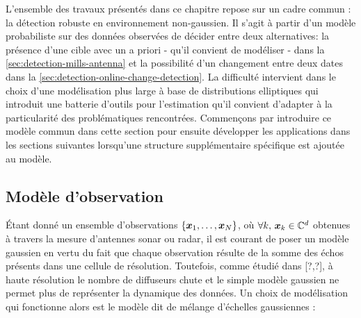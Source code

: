 L'ensemble des travaux présentés dans ce chapitre repose sur un cadre commun : la détection robuste en environnement non-gaussien. Il s'agit à partir d'un modèle probabiliste sur des données observées de décider entre deux alternatives: la présence d'une cible avec un a priori - qu'il convient de modéliser - dans la \cref{sec:detection-mills-antenna} et la possibilité d'un changement entre deux dates dans la \cref{sec:detection-online-change-detection}. La difficulté intervient dans le choix d'une modélisation plus large à base de distributions elliptiques qui introduit une batterie d'outils pour l'estimation qu'il convient d'adapter à la particularité des problématiques rencontrées. Commençons par introduire ce modèle commun dans cette section pour ensuite développer les applications dans les sections suivantes lorsqu'une structure supplémentaire spécifique est ajoutée au modèle.


\subsection{Modèle d'observation}
\label{subsec:detection-modele}


\'Etant donné un ensemble d'observations $\{\boldsymbol{x}_1,\dots,\boldsymbol{x}_N\}$, où $\forall k,\, \boldsymbol{x}_k\in\mathbb{C}^d$ obtenues à travers la mesure d'antennes sonar ou radar, il est courant de poser un modèle gaussien en vertu du fait que chaque observation résulte de la somme des échos présents dans une cellule de résolution. Toutefois, comme étudié dans [?,?], à haute résolution le nombre de diffuseurs chute et le simple modèle gaussien ne permet plus de représenter la dynamique des données. Un choix de modélisation qui fonctionne alors est le modèle dit de mélange d'échelles gaussiennes :

